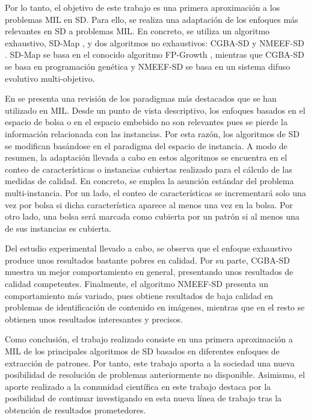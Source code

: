 \documentclass[c5paper,10pt,twoside]{book}	   	%
\begin{document}
Por lo tanto, el objetivo de este trabajo es una primera aproximación a los problemas \ac{MIL} en \ac{SD}. Para ello, se realiza una adaptación de los enfoques más relevantes en \ac{SD} a problemas \ac{MIL}. En concreto, se utiliza un algoritmo exhaustivo, SD-Map \cite{Ap06}, y dos algoritmos no exhaustivos: CGBA-SD \cite{Lrrv14} y NMEEF-SD \cite{Cgdh10}. SD-Map se basa en el conocido algoritmo FP-Growth \cite{han2004mining}, mientras que CGBA-SD se basa en programación genética y NMEEF-SD se basa en un sistema difuso evolutivo multi-objetivo.

En \cite{Amores13} se presenta una revisión de los paradigmas más destacados que se han utilizado en \ac{MIL}. Desde un punto de vista descriptivo, los enfoques basados en el espacio de bolsa o en el espacio embebido no son relevantes pues se pierde la información relacionada con las instancias. Por esta razón, los algoritmos de \ac{SD} se modifican basándose en el paradigma del espacio de instancia. A modo de resumen, la adaptación llevada a cabo en estos algoritmos se encuentra en el conteo de características o instancias cubiertas realizado para el cálculo de las medidas de calidad. En concreto, se emplea la asunción estándar del problema multi-instancia. Por un lado, el conteo de características se incrementará solo una vez por bolsa si dicha característica aparece al menos una vez en la bolsa. Por otro lado, una bolsa será marcada como cubierta por un patrón si al menos una de sus instancias es cubierta.

Del estudio experimental llevado a cabo, se observa que el enfoque exhaustivo produce unos resultados bastante pobres en calidad. Por su parte, CGBA-SD muestra un mejor comportamiento en general, presentando unos resultados de calidad competentes. Finalmente, el algoritmo NMEEF-SD presenta un comportamiento más variado, pues obtiene resultados de baja calidad en problemas de identificación de contenido en imágenes, mientras que en el resto se obtienen unos resultados interesantes y precisos. 

Como conclusión, el trabajo realizado consiste en una primera aproximación a \ac{MIL} de los principales algoritmos de \ac{SD} basados en diferentes enfoques de extracción de patrones. Por tanto, este trabajo aporta a la sociedad una nueva posibilidad de resolución de problemas anteriormente no disponible. Asimismo, el aporte realizado a la comunidad científica en este trabajo destaca por la posibilidad de continuar investigando en esta nueva línea de trabajo tras la obtención de resultados prometedores.
\end{document}
